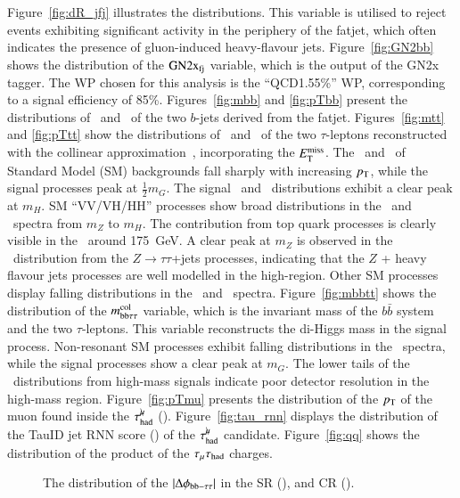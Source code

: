     Figure~\ref{fig:dR_jfj} illustrates the \dRjfj distributions. 
    This variable is utilised to reject events exhibiting significant 
    activity in the periphery of the fatjet, which often indicates the presence of gluon-induced heavy-flavour jets.
    Figure~\ref{fig:GN2bb} shows the distribution of the $\mathrm{GN2x}_\mathrm{fj}$ variable, which is the output of the GN2x tagger. 
    The WP chosen for this analysis is the ``QCD1.55\%'' WP, corresponding to a signal efficiency of 85\%. 
    Figures~\ref{fig:mbb} and \ref{fig:pTbb} present the distributions of \mbb\ and \ptbb\ of the two $b$-jets derived from the fatjet. 
    Figures~\ref{fig:mtt} and \ref{fig:pTtt} show the distributions of \mttcol\ and \pttt\ of the two $\tau$-leptons reconstructed with the collinear approximation~\cite{Dong:2890038, Dong:2899443}, incorporating the $E_{\text{T}}^{\text{miss}}$. 
    The \ptbb\ and \pttt\ of Standard Model (SM) backgrounds fall sharply with increasing $p_{\text{T}}$, while the signal processes peak at $\frac{1}{2}m_G$.
    The signal \mbb\ and \mttcol\ distributions exhibit a clear peak at $m_H$.
    SM ``VV/VH/HH'' processes show broad distributions in the \mbb\ and \mttcol\ spectra from $m_Z$ to $m_H$. The contribution from top quark processes is clearly visible in the \mbb\ around 175~GeV. 
    A clear peak at $m_Z$ is observed in the \mttcol\ distribution from the $Z\rightarrow\tau\tau$+jets processes, indicating that the $Z$ + heavy flavour jets processes are well modelled in the high-\pt region.
    Other SM processes display falling distributions in the \mbb\ and \mttcol\ spectra.
    Figure~\ref{fig:mbbtt} shows the distribution of the $m_\mathrm{bb\tau\tau}^\mathrm{col}$ variable, which is the invariant mass of the $b\bar{b}$ system and the two $\tau$-leptons. 
    This variable reconstructs the di-Higgs mass in the signal process. 
    Non-resonant SM processes exhibit falling distributions in the \mbbttcol\ spectra, 
    while the signal processes show a clear peak at $m_G$. 
    The lower tails of the \mbbttcol\ distributions from high-mass signals indicate poor detector resolution in the high-mass region. 
    Figure~\ref{fig:pTmu} presents the distribution of the $p_{\text{T}}$ of the muon found inside the $\tau_\mathrm{had}^{\mu\mkern-10mu\backslash}$ (\ptmuon). 
    Figure~\ref{fig:tau_rnn} displays the distribution of the TauID jet RNN score (\rnn) of the $\tau_\mathrm{had}^{\mu\mkern-10mu\backslash}$ candidate. 
    Figure~\ref{fig:qq} shows the distribution of the product of the $\tau_\mathrm{\mu}\tau_\mathrm{had}$ charges.

    \begin{figure}[htbp]
        \centering
        \caption{
            The distribution of the $|\Delta\phi_\mathrm{bb-\tau\tau}|$ in the SR (\protect{}), and CR (\protect{}).
        }    
        \label{fig:absDphi_bbtt}
    \end{figure}

